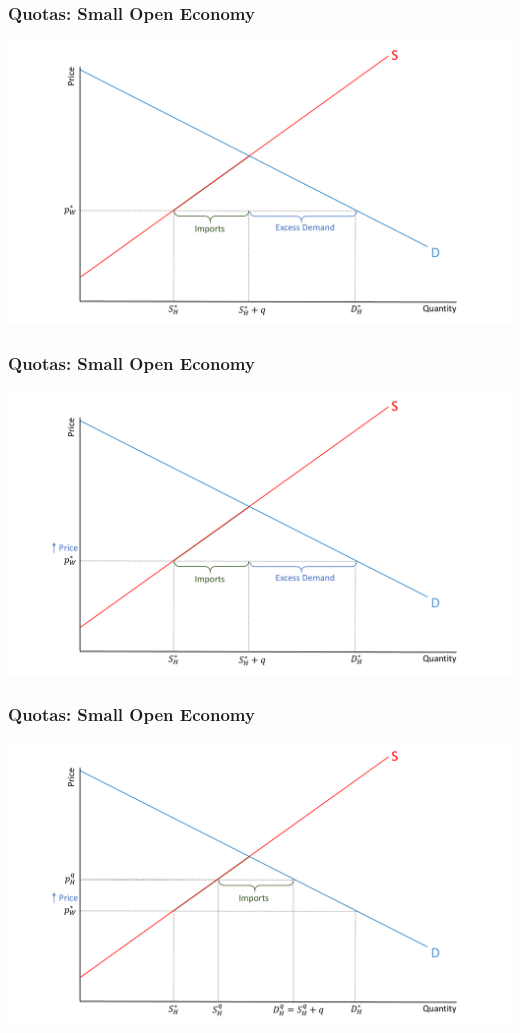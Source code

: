 \documentclass{beamer}
\begin{document}
\begin{frame}
	\frametitle{Quotas: Small Open Economy}
	
	\includegraphics[scale=0.3]{SL_17.pdf}
	
\end{frame}

\begin{frame}
	\frametitle{Quotas: Small Open Economy}
	
	\includegraphics[scale=0.3]{SL_18.pdf}
	
\end{frame}

\begin{frame}
	\frametitle{Quotas: Small Open Economy}
	
	\includegraphics[scale=0.3]{SL_19.pdf}
	
\end{frame}
\end{document}
